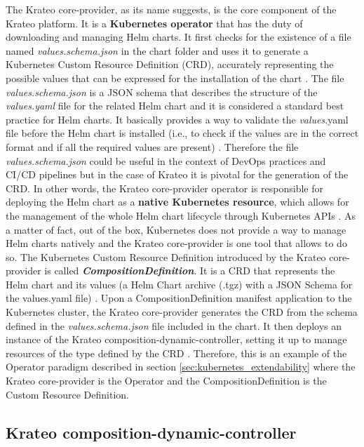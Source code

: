 The Krateo core-provider, as its name suggests, is the core component of the Krateo platform.
It is a \textbf{Kubernetes operator} that has the duty of downloading and managing Helm charts. 
It first checks for the existence of a file named \textit{values.schema.json} in the chart folder and uses it to generate a Kubernetes Custom Resource Definition (CRD), accurately representing the possible values that can be expressed for the installation of the chart \cite{krateo_core_provider}.
The file \textit{values.schema.json} is a JSON schema that describes the structure of the \textit{values.yaml} file for the related Helm chart and it is considered a standard best practice for Helm charts. 
It basically provides a way to validate the \textit{values}.yaml file before the Helm chart is installed (i.e., to check if the values are in the correct format and if all the required values are present) \cite{krateo_core_provider}.
Therefore the file \textit{values.schema.json} could be useful in the context of DevOps practices and CI/CD pipelines but in the case of Krateo it is pivotal for the generation of the CRD.
In other words, the Krateo core-provider operator is responsible for deploying the Helm chart as a \textbf{native Kubernetes resource}, which allows for the management of the whole Helm chart lifecycle through Kubernetes APIs \cite{krateo_core_provider}.
As a matter of fact, out of the box, Kubernetes does not provide a way to manage Helm charts natively and the Krateo core-provider is one tool that allows to do so.
The Kubernetes Custom Resource Definition introduced by the Krateo core-provider is called \textbf{\textit{CompositionDefinition}}. 
It is a CRD that represents the Helm chart and its values (a Helm Chart archive (.tgz) with a JSON Schema for the values.yaml file) \cite{krateo_core_provider}.
Upon a CompositionDefinition manifest application to the Kubernetes cluster, the Krateo core-provider generates the CRD from the schema defined in the \textit{values.schema.json} file included in the chart. 
It then deploys an instance of the Krateo composition-dynamic-controller, setting it up to manage resources of the type defined by the CRD \cite{krateo_core_provider}.
Therefore, this is an example of the Operator paradigm described in section \ref{sec:kubernetes_extendability} where the Krateo core-provider is the Operator and the CompositionDefinition is the Custom Resource Definition.

\subsection{Krateo composition-dynamic-controller}

